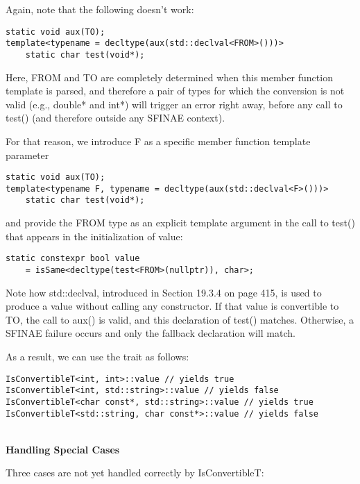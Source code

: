 Again, note that the following doesn’t work:

\begin{lstlisting}[style=styleCXX]
static void aux(TO);
template<typename = decltype(aux(std::declval<FROM>()))>
	static char test(void*);
\end{lstlisting}

Here, FROM and TO are completely determined when this member function template is parsed, and therefore a pair of types for which the conversion is not valid (e.g., double* and int*) will trigger an error right away, before any call to test() (and therefore outside any SFINAE context).

For that reason, we introduce F as a specific member function template parameter

\begin{lstlisting}[style=styleCXX]
static void aux(TO);
template<typename F, typename = decltype(aux(std::declval<F>()))>
	static char test(void*);
\end{lstlisting}

and provide the FROM type as an explicit template argument in the call to test() that appears in the initialization of value:

\begin{lstlisting}[style=styleCXX]
static constexpr bool value
	= isSame<decltype(test<FROM>(nullptr)), char>;
\end{lstlisting}

Note how std::declval, introduced in Section 19.3.4 on page 415, is used to produce a value without calling any constructor. If that value is convertible to TO, the call to aux() is valid, and this declaration of test() matches. Otherwise, a SFINAE failure occurs and only the fallback declaration will match.

As a result, we can use the trait as follows:

\begin{lstlisting}[style=styleCXX]
IsConvertibleT<int, int>::value // yields true
IsConvertibleT<int, std::string>::value // yields false
IsConvertibleT<char const*, std::string>::value // yields true
IsConvertibleT<std::string, char const*>::value // yields false
\end{lstlisting}

\hspace*{\fill} \\ %
\noindent
\textbf{Handling Special Cases}

Three cases are not yet handled correctly by IsConvertibleT:

